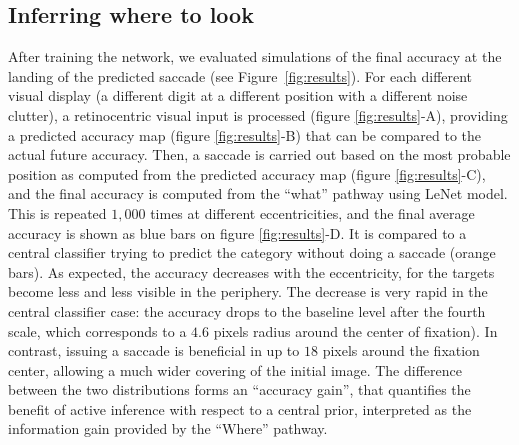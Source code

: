 \subsection{Inferring where to look}
\fi
After training the network, we evaluated simulations of the final accuracy at the landing of the predicted saccade (see Figure~\ref{fig:results}). For each different visual display (a different digit at a different position with a different noise clutter), a retinocentric visual input is processed (figure \ref{fig:results}-A), providing a predicted accuracy map (figure \ref{fig:results}-B) that can be compared to the actual future accuracy. Then, a saccade is carried out based on the most probable position as computed from the predicted accuracy map (figure \ref{fig:results}-C), and the final accuracy is computed from the ``what'' pathway using LeNet model. This is repeated $1,000$ times at different eccentricities, and the final average accuracy is shown as blue bars on figure \ref{fig:results}-D. It is compared to a central classifier trying to predict the category without doing a saccade (orange bars). As expected, the accuracy decreases with the eccentricity, for the targets become less and less visible in the periphery. The decrease is very rapid in the central classifier case: the accuracy drops to the baseline level %
after the fourth scale, which corresponds to a $4.6$ pixels radius around the center of fixation). In contrast, issuing a saccade is beneficial in up to $18$ pixels around the fixation center, allowing a much wider covering of the initial image. The difference between the two distributions forms an ``accuracy gain'', that quantifies the benefit of active inference with respect to a central prior, interpreted as the information gain provided by the ``Where'' pathway.



